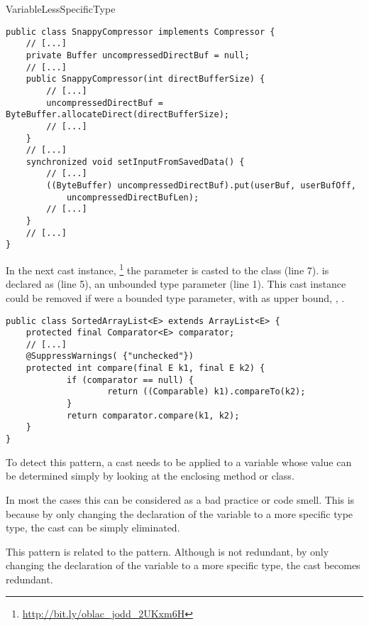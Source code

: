 \begin{pattern}{VariableLessSpecificType}
\begin{verbatim}
public class SnappyCompressor implements Compressor {
    // [...]
    private Buffer uncompressedDirectBuf = null;
    // [...]
    public SnappyCompressor(int directBufferSize) {
        // [...]
        uncompressedDirectBuf = ByteBuffer.allocateDirect(directBufferSize);
        // [...]
    }
    // [...]
    synchronized void setInputFromSavedData() {
        // [...]
        ((ByteBuffer) uncompressedDirectBuf).put(userBuf, userBufOff,
            uncompressedDirectBufLen);
        // [...]
    }
    // [...]
}
\end{verbatim}

In the next cast instance,%
\footnote{\url{http://bit.ly/oblac_jodd_2UKxm6H}}
the parameter  is casted to the  class (line 7).
 is declared as  (line 5), an unbounded type parameter (line 1).
This cast instance could be removed if  were a bounded type parameter, with  as upper bound, \ie,
.

\begin{verbatim}
public class SortedArrayList<E> extends ArrayList<E> {
    protected final Comparator<E> comparator;
    // [...]
    @SuppressWarnings( {"unchecked"})
    protected int compare(final E k1, final E k2) {
            if (comparator == null) {
                    return ((Comparable) k1).compareTo(k2);
            }
            return comparator.compare(k1, k2);
    }
}
\end{verbatim}

\detection{}
To detect this pattern, a cast needs to be applied to a variable whose
value can be determined simply by looking at
the enclosing method or class.

\discussion{}
In most the cases this can be considered as a bad practice or
code smell.
This is because by only changing the declaration of the variable
to a more specific type type, the cast can be simply eliminated.

\related{}
This pattern is related to the  pattern.
Although \thisp{} is not redundant,
by only changing the declaration of the variable to a more specific type,
the cast becomes redundant.

\end{pattern}